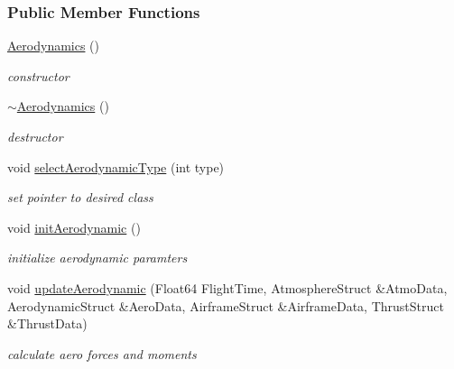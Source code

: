 \subsubsection*{Public Member Functions}
\begin{DoxyCompactItemize}
\item 
\mbox{\label{group___aerodynamic_a36c7ae850ce18605cdbf3ce1709d8e54}} 
\hyperlink{group___aerodynamic_a36c7ae850ce18605cdbf3ce1709d8e54}{Aerodynamics} ()
\begin{DoxyCompactList}\small\item\em constructor \end{DoxyCompactList}\item 
\mbox{\label{group___aerodynamic_af0e048e0c80ec8334997b79b761fea60}} 
\hyperlink{group___aerodynamic_af0e048e0c80ec8334997b79b761fea60}{$\sim$\+Aerodynamics} ()
\begin{DoxyCompactList}\small\item\em destructor \end{DoxyCompactList}\item 
\mbox{\label{group___aerodynamic_a9aa3397e8b1d91ed237146a57bbe6bcf}} 
void \hyperlink{group___aerodynamic_a9aa3397e8b1d91ed237146a57bbe6bcf}{select\+Aerodynamic\+Type} (int type)
\begin{DoxyCompactList}\small\item\em set pointer to desired class \end{DoxyCompactList}\item 
\mbox{\label{group___aerodynamic_a2382a1b24c0b3948629103747cce3db1}} 
void \hyperlink{group___aerodynamic_a2382a1b24c0b3948629103747cce3db1}{init\+Aerodynamic} ()
\begin{DoxyCompactList}\small\item\em initialize aerodynamic paramters \end{DoxyCompactList}\item 
\mbox{\label{group___aerodynamic_adf6047b063022ff3b689e269d2b35863}} 
void \hyperlink{group___aerodynamic_adf6047b063022ff3b689e269d2b35863}{update\+Aerodynamic} (Float64 Flight\+Time, Atmosphere\+Struct \&Atmo\+Data, Aerodynamic\+Struct \&Aero\+Data, Airframe\+Struct \&Airframe\+Data, Thrust\+Struct \&Thrust\+Data)
\begin{DoxyCompactList}\small\item\em calculate aero forces and moments \end{DoxyCompactList}\end{DoxyCompactItemize}
\label{class_base_aerodynamic}

